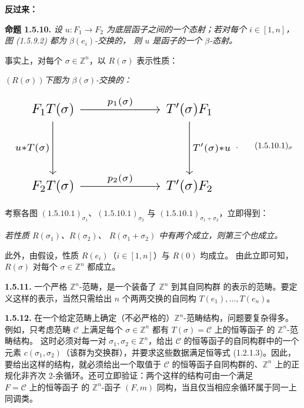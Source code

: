 \clearpage
{}%
\noindent\textbf{反过来：}\par

\noindent\textbf{命题 1.5.10.}\quad
\emph{设 $u\colon F_1\to F_2$ 为底层函子之间的一个态射；若对每个
$i\in[1,n]$，图 (1.5.9.2) 都为 $\beta(e_i)$-交换的，
则 $u$ 是函子的一个 $\beta$-态射。}

事实上，对每个 $\sigma\in\mathbb Z^n$，以 $R(\sigma)$ 表示性质：

\noindent\emph{$(R(\sigma))$\qquad 下图为 $\beta(\sigma)$-交换的：}

\begin{equation}
  \resizebox{0.78\textwidth}{!}{%
    $\begin{tikzcd}[ampersand replacement=\&,column sep=6em,row sep=4em]
      F_1T(\sigma)
        \arrow[r,"{p_1(\sigma)}"]
        \arrow[d,"{u*T(\sigma)}"']
        \& T'(\sigma)F_1
          \arrow[d,"{T'(\sigma)*u}"] \\
      F_2T(\sigma)
        \arrow[r,"{p_2(\sigma)}"]
        \& T'(\sigma)F_2
    \end{tikzcd}$%
  }\;.
  \tag*{\ensuremath{(1.5.10.1)_{\sigma}}}
\end{equation}

考察各图 $(1.5.10.1)_{\sigma_1}$、$(1.5.10.1)_{\sigma_2}$ 与
$(1.5.10.1)_{\sigma_1+\sigma_2}$，立即得到：

\noindent\emph{若性质 $R(\sigma_1)$、$R(\sigma_2)$、
$R(\sigma_1+\sigma_2)$ 中有两个成立，则第三个也成立。}

此外，由假设，性质 $R(e_i)$（$i\in[1,n]$）与 $R(0)$ 均成立。
由此立即可知，$R(\sigma)$ 对每个 $\sigma\in\mathbb Z^n$ 都成立。

\noindent\textbf{1.5.11.}\quad
一个严格 $\mathbb Z^n$-范畴，是一个装备了 $\mathbb Z^n$ 到其自同构群
的表示的范畴。要定义这样的表示，当然只需给出 $n$ 个两两交换的自同构
$T(e_1),\ldots,T(e_n)$。

\noindent\textbf{1.5.12.}\quad
在一个给定范畴上确定（不必严格的）$\mathbb Z^n$-范畴结构，问题要复杂得多。
例如，只考虑范畴 $\mathcal C$ 上满足每个 $\sigma\in\mathbb Z^n$ 都有
$T(\sigma)=\text{$\mathcal C$ 上的恒等函子}$ 的 $\mathbb Z^n$-范畴结构。
这时必须对每一对 $\sigma_1,\sigma_2\in\mathbb Z^n$，给出
$\mathcal C$ 的恒等函子的自同构群中的一个元素
$c(\sigma_1,\sigma_2)$（该群为交换群），并要求这些数据满足恒等式
(1.2.1.3)。因此，要给出这样的结构，就必须给出一个取值于
$\mathcal C$ 的恒等函子自同构群的、$\mathbb Z^n$ 上的正规化非齐次
2-余循环。还可立即验证：两个这样的结构可由一个满足
$F=\text{$\mathcal C$ 上的恒等函子}$ 的 $\mathbb Z^n$-函子 $(F,m)$
同构，当且仅当相应余循环属于同一上同调类。
